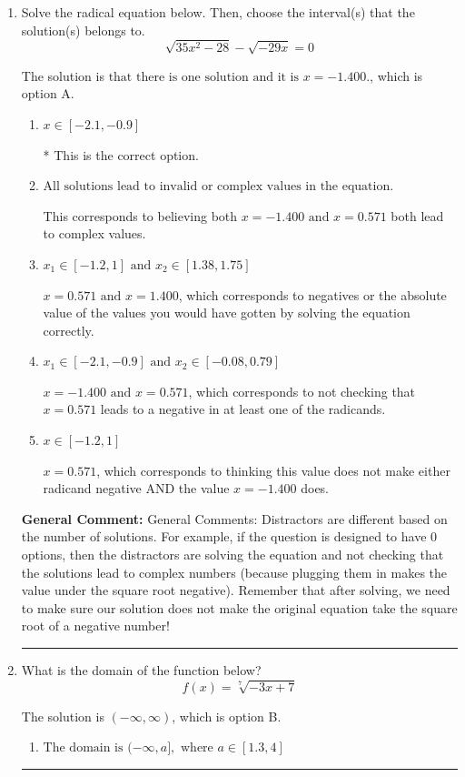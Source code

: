 \documentclass{extbook}[14pt]
\newcommand{\litem}[1]{\item #1

\rule{\textwidth}{0.4pt}}
\begin{document}
\begin{enumerate}\litem{
Solve the radical equation below. Then, choose the interval(s) that the solution(s) belongs to.
\[ \sqrt{35 x^2 - 28} - \sqrt{-29 x} = 0 \]

The solution is \( \text{that there is one solution and it is } x = -1.400. \), which is option A.\begin{enumerate}[label=\Alph*.]
\item \( x \in [-2.1,-0.9] \)

* This is the correct option.
\item \( \text{All solutions lead to invalid or complex values in the equation.} \)

This corresponds to believing both $x = -1.400 \text{ and } x = 0.571$ both lead to complex values.
\item \( x_1 \in [-1.2, 1] \text{ and } x_2 \in [1.38,1.75] \)

$x = 0.571 \text{ and } x = 1.400$, which corresponds to negatives or the absolute value of the values you would have gotten by solving the equation correctly.
\item \( x_1 \in [-2.1, -0.9] \text{ and } x_2 \in [-0.08,0.79] \)

$x = -1.400 \text{ and } x = 0.571$, which corresponds to not checking that $x = 0.571$ leads to a negative in at least one of the radicands.
\item \( x \in [-1.2,1] \)

$x = 0.571$, which corresponds to thinking this value does not make either radicand negative AND the value $x = -1.400$ does.
\end{enumerate}

\textbf{General Comment:} General Comments: Distractors are different based on the number of solutions. For example, if the question is designed to have 0 options, then the distractors are solving the equation and not checking that the solutions lead to complex numbers (because plugging them in makes the value under the square root negative). Remember that after solving, we need to make sure our solution does not make the original equation take the square root of a negative number!
}
\litem{
What is the domain of the function below?
\[ f(x) = \sqrt[7]{-3 x + 7} \]

The solution is \( (-\infty, \infty) \), which is option B.\begin{enumerate}[label=\Alph*.]
\item \( \text{The domain is } (-\infty, a], \text{   where } a \in [1.3, 4] \)


\end{enumerate}}
\end{enumerate}
\end{document}
